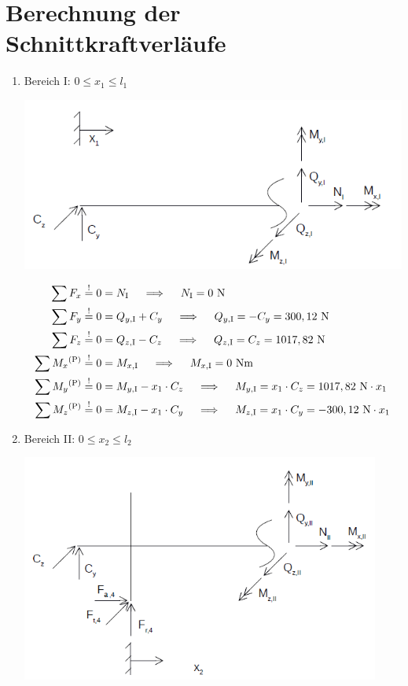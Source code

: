 \section{Berechnung der Schnittkraftverläufe}
\renewcommand{\labelenumi}{\roman{enumi})}
\begin{enumerate}
\item Bereich I: $0 \leq x_1 \leq l_1$
\begin{center}
	\includegraphics[width=1.04\textwidth,keepaspectratio]{figures/Bereich1.png}
\end{center}
    \begin{align*}
        \sum F_x &\overset{!}{=} 0 = N_{\mathrm{I}} \quad \implies \quad  N_{\mathrm{I}} = 0 \text{ N}\\ 
        \sum F_y &\overset{!}{=} 0 =  Q_{y,\mathrm{I}} + C_y \quad \implies \quad  Q_{y,\mathrm{I}} = -C_y = 300,12\text{ N}\\
        \sum F_z &\overset{!}{=} 0 =  Q_{z,\mathrm{I}} - C_z \quad \implies \quad  Q_{z,\mathrm{I}} = C_z = 1017,82\text{ N}\\
        \sum M_x \textsuperscript{(P)}&\overset{!}{=} 0 = M_{x,\mathrm{I}} \quad \implies \quad   M_{x,\mathrm{I}} = 0 \text{ Nm} \\ 
        \sum M_y \textsuperscript{(P)}&\overset{!}{=} 0 = M_{y,\mathrm{I}} - x_1 \cdot C_z \quad \implies \quad   M_{y,\mathrm{I}} =x_1 \cdot C_z =1017,82 \text{ N} \cdot x_1\\ 
        \sum M_z \textsuperscript{(P)}&\overset{!}{=} 0 = M_{z,\mathrm{I}} -x_1 \cdot C_y  \quad \implies \quad   M_{z,\mathrm{I}} = x_1 \cdot C_y = -300,12 \text{ N} \cdot x_1 \\ 
    \end{align*}
\newpage
\item Bereich II: $0 \leq x_2 \leq l_2$
\begin{center}
	\includegraphics[width=0.93\textwidth,keepaspectratio]{figures/Bereich2.png}

\end{center}
\end{enumerate}
